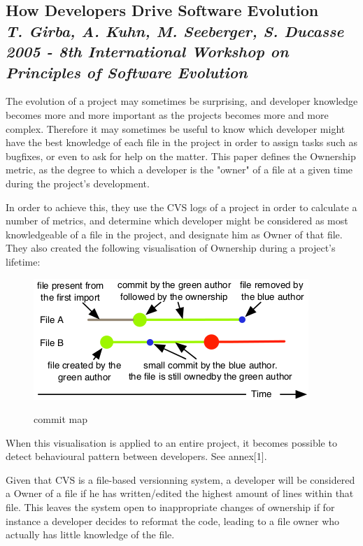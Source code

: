 \subsection{How Developers Drive Software Evolution\\ \textit{T. Girba, A. Kuhn, M. Seeberger, S. Ducasse\\
2005 - 8th International Workshop on Principles of Software Evolution}}

The evolution of a project may sometimes be surprising, and developer knowledge becomes more and more important as the projects becomes more and more complex. Therefore it may sometimes be useful to know which developer might have the best knowledge of each file in the project in order to assign tasks such as bugfixes, or even to ask for help on the matter.
This paper defines the Ownership metric, as the degree to which a developer is the "owner" of a file at a given time during the project's development.

In order to achieve this, they use the CVS logs of a project in order to calculate a number of metrics, and determine which developer might be considered as most knowledgeable of a file in the project, and designate him as Owner of that file.
They also created the following visualisation of Ownership during a project's lifetime:

\begin{figure}[H]
\includegraphics[keepaspectratio=true,scale=0.5]{./resources/girba2005.png}~
\caption{commit map}
\label{fig:commit_map}
\end{figure}

When this visualisation is applied to an entire project, it becomes possible to detect behavioural pattern between developers. See annex[1].

Given that CVS is a file-based versionning system, a developer will be considered a Owner of a file if he has written/edited the highest amount of lines within that file. This leaves the system open to inappropriate changes of ownership if for instance a developer decides to reformat the code, leading to a file owner who actually has little knowledge of the file.

